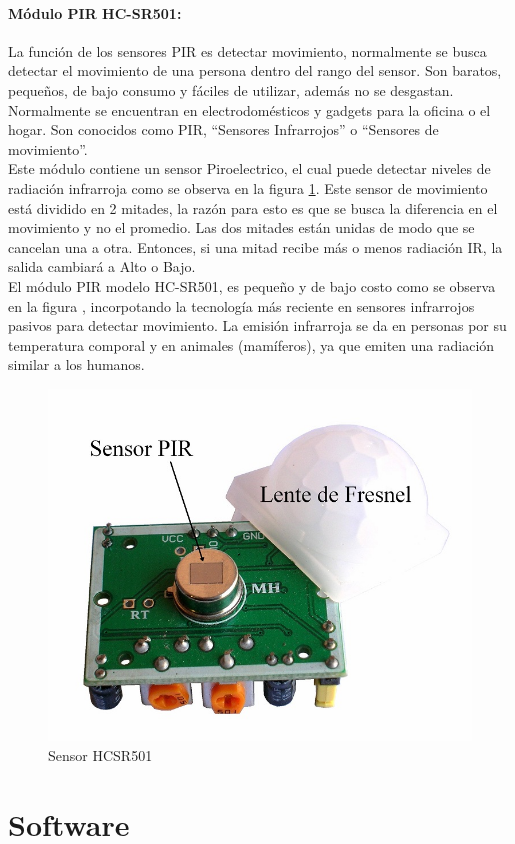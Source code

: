\paragraph{Módulo PIR HC-SR501: }

La función de los sensores PIR es detectar movimiento, normalmente se busca detectar el movimiento de una persona dentro del rango del sensor. Son baratos, pequeños, de bajo consumo y fáciles de utilizar, además no se desgastan. Normalmente se encuentran en electrodomésticos y gadgets para la oficina o el hogar. Son conocidos como PIR, ``Sensores Infrarrojos'' o ``Sensores de movimiento''.\\

Este módulo contiene un sensor Piroelectrico, el cual puede detectar niveles de radiación infrarroja como se observa en la figura \ref{fig:sensor-hc-sr501-1000-m}. Este sensor de movimiento está dividido en 2 mitades, la razón para esto es que se busca la diferencia en el movimiento y no el promedio. Las dos mitades están unidas  de modo que se cancelan una a otra. Entonces, si una mitad recibe más o menos radiación IR, la salida cambiará a Alto o Bajo. \cite{PIR1}\\

El módulo PIR modelo HC-SR501, es pequeño y de bajo costo como se observa en la figura , incorpotando la tecnología más reciente en sensores infrarrojos pasivos para detectar movimiento. La emisión infrarroja se da en personas por su temperatura comporal y en animales (mamíferos), ya que emiten una radiación similar a los humanos. \cite{PIR2}

\begin{figure}
	\centering
	\caption{Sensor HCSR501 \cite{PIR2}}
	\label{fig:sensor-hc-sr501-1000-m}
	\includegraphics[width=0.5\linewidth]{Imagenes/SENSOR-HC-SR501-1000-M}
\end{figure}

\section{Software}

